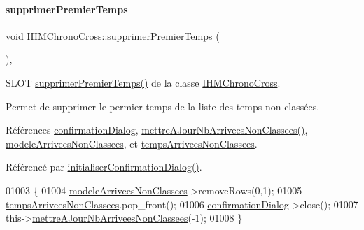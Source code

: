 \paragraph{\texorpdfstring{supprimer\+Premier\+Temps}{supprimerPremierTemps}}
{\footnotesize\ttfamily void I\+H\+M\+Chrono\+Cross\+::supprimer\+Premier\+Temps (\begin{DoxyParamCaption}{ }\end{DoxyParamCaption})\hspace{0.3cm}{\ttfamily [private]}, {\ttfamily [slot]}}



S\+L\+OT \hyperlink{class_i_h_m_chrono_cross_aca8b5d6683a3ab0018066ec16968f3f3}{supprimer\+Premier\+Temps()} de la classe \hyperlink{class_i_h_m_chrono_cross}{I\+H\+M\+Chrono\+Cross}. 

Permet de supprimer le permier temps de la liste des temps non classées. 

Références \hyperlink{class_i_h_m_chrono_cross_ad7fc4afa5689501063cc207a8daf5752}{confirmation\+Dialog}, \hyperlink{class_i_h_m_chrono_cross_a1b23fda62742f2dd17652d3abcb33dd6}{mettre\+A\+Jour\+Nb\+Arrivees\+Non\+Classees()}, \hyperlink{class_i_h_m_chrono_cross_a12a210c6a93f70df764841b7d322b05c}{modele\+Arrivees\+Non\+Classees}, et \hyperlink{class_i_h_m_chrono_cross_a9d0542a5334cd284d1ea9cf732cb013e}{temps\+Arrivees\+Non\+Classees}.



Référencé par \hyperlink{class_i_h_m_chrono_cross_a866a247fad23eca2af31ed985afe7cd3}{initialiser\+Confirmation\+Dialog()}.


\begin{DoxyCode}
01003 \{
01004     \hyperlink{class_i_h_m_chrono_cross_a12a210c6a93f70df764841b7d322b05c}{modeleArriveesNonClassees}->removeRows(0,1);
01005     \hyperlink{class_i_h_m_chrono_cross_a9d0542a5334cd284d1ea9cf732cb013e}{tempsArriveesNonClassees}.pop\_front();
01006     \hyperlink{class_i_h_m_chrono_cross_ad7fc4afa5689501063cc207a8daf5752}{confirmationDialog}->close();
01007     this->\hyperlink{class_i_h_m_chrono_cross_a1b23fda62742f2dd17652d3abcb33dd6}{mettreAJourNbArriveesNonClassees}(-1);
01008 \}
\end{DoxyCode}
\mbox{\label{class_i_h_m_chrono_cross_a32ee157ca6bd8c3e94b57f3cecdeee4e}} 
